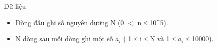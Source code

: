 Dữ liệu
\begin{itemize}
	\item     Dòng đầu ghi số nguyên dương N (0 $<$ n ≤ 10^5).   
	\item     N dòng sau mỗi dòng ghi một số $a_{i}$    ( 1 ≤ i ≤ N và 1 ≤ $a_{i}$    ≤ 10000).   
\end{itemize}